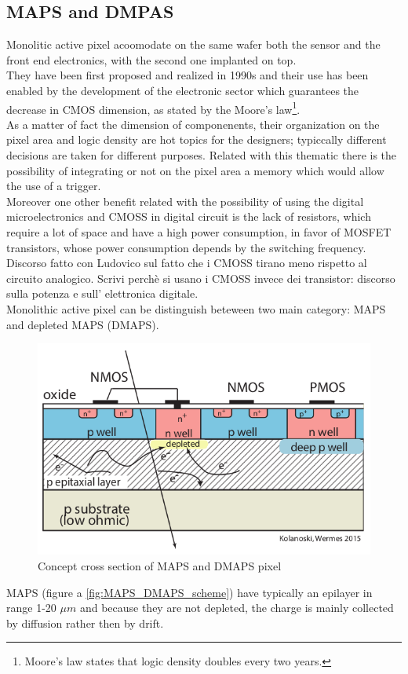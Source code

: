 \begin{titlepage}
\subsection{MAPS and DMPAS}
Monolitic active pixel acoomodate on the same wafer both the sensor and the front
end electronics, with the second one implanted on top.\\
They have been first proposed and realized in 1990s and their use has been enabled
by the development of the electronic sector which guarantees the decrease in CMOS
dimension, as stated by the Moore's law\footnote{Moore's law states that logic
density doubles every two years.}.\\
As a matter of fact the dimension of componenents, their organization on the
pixel area and logic density are hot topics for the designers; typiccally
different decisions are taken for different purposes. Related with this thematic there is the possibility
of integrating or not on the pixel area a memory which would allow the use of a trigger. \\ 
Moreover one other benefit related with the possibility of using the digital microelectronics
and CMOSS in digital circuit is the lack of resistors, which require a lot of
space and have a high power consumption, in favor of MOSFET transistors, whose power
consumption depends by the switching frequency. Discorso fatto con Ludovico
sul fatto che i CMOSS tirano meno rispetto al circuito analogico.
Scrivi perchè si usano i CMOSS invece dei transistor: discorso sulla potenza e sull'
elettronica digitale.\\
Monolithic active pixel can be distinguish beteween two main category: MAPS and depleted
MAPS (DMAPS).\\
\begin{figure}
   \centering
   \includegraphics[width=.4\linewidth]{figures/MAPS_scheme.png}
   \caption{Concept cross section of MAPS and DMAPS pixel}
   \label{fig:MAPS_scheme}
\end{figure}
MAPS (figure a \ref{fig:MAPS_DMAPS_scheme}) have typically an epilayer in range 
1-20 $\mu m$ and because they
are not depleted, the charge is mainly collected by diffusion rather then by drift.

\end{titlepage}
